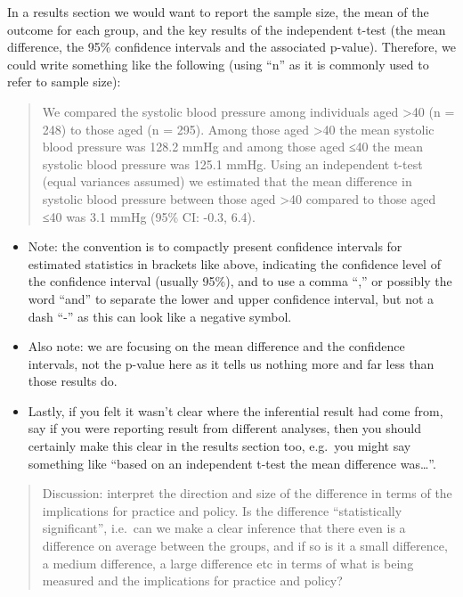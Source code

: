 \documentclass[
]{book}
\begin{document}
In a results section we would want to report the sample size, the mean of the outcome for each group, and the key results of the independent t-test (the mean difference, the 95\% confidence intervals and the associated p-value). Therefore, we could write something like the following (using ``n'' as it is commonly used to refer to sample size):

\begin{quote}
We compared the systolic blood pressure among individuals aged \textgreater40 (n = 248) to those aged (n = 295). Among those aged \textgreater40 the mean systolic blood pressure was 128.2 mmHg and among those aged ≤40 the mean systolic blood pressure was 125.1 mmHg. Using an independent t-test (equal variances assumed) we estimated that the mean difference in systolic blood pressure between those aged \textgreater40 compared to those aged ≤40 was 3.1 mmHg (95\% CI: -0.3, 6.4).
\end{quote}

\begin{itemize}
\item
  Note: the convention is to compactly present confidence intervals for estimated statistics in brackets like above, indicating the confidence level of the confidence interval (usually 95\%), and to use a comma ``,'' or possibly the word ``and'' to separate the lower and upper confidence interval, but not a dash ``-'' as this can look like a negative symbol.
\item
  Also note: we are focusing on the mean difference and the confidence intervals, not the p-value here as it tells us nothing more and far less than those results do.
\item
  Lastly, if you felt it wasn't clear where the inferential result had come from, say if you were reporting result from different analyses, then you should certainly make this clear in the results section too, e.g.~you might say something like ``based on an independent t-test the mean difference was\ldots{}''.
\end{itemize}

\begin{quote}
Discussion: interpret the direction and size of the difference in terms of the implications for practice and policy. Is the difference ``statistically significant'', i.e.~can we make a clear inference that there even is a difference on average between the groups, and if so is it a small difference, a medium difference, a large difference etc in terms of what is being measured and the implications for practice and policy?
\end{quote}
\end{document}
